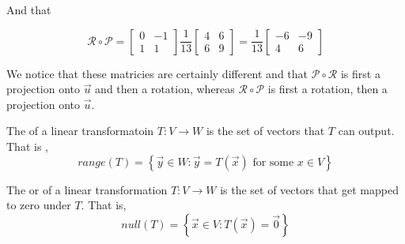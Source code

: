 \documentclass[notoc,notitlepage]{tufte-book}
\newcommand\mat[1]{\begin{bmatrix}#1\end{bmatrix}}
\begin{document}
And that 

\begin{equation*}
    \mathcal{R} \circ \mathcal{P} = \mat{ 0 & -1 \\ 1 & 1 } \frac{1}{13}
    \mat{ 4 & 6 \\ 6 & 9 } = \frac{1}{13} \mat{ -6 & -9 \\ 4 & 6 }
\end{equation*}

We notice that these matricies are certainly different and that $\mathcal{P}
\circ \mathcal{R}$ is first a projection onto $\vec{u}$ and then a rotation,
whereas $\mathcal{R} \circ \mathcal{P}$ is first a rotation, then a projection
onto $\vec{u}$.



\begin{defn}[Range]\label{defn:range}
    The  of a linear transformatoin $T : V \to W $ is the set of
    vectors that $T$ can output. That is ,
    \begin{equation*}
        \mathit{range} {\left( T \right)} = \left\{ \vec{y} \in W : \vec{y} =
        T\left(\vec{x} \right) \text{ for some } x \in V  \right\}
    \end{equation*}
\end{defn}

\begin{defn}\label{defn:null_space}
    The  or  of a linear transformation $T :
    V\to W $ is the set of vectors that get mapped to zero under $T$. That is,
    \begin{equation*}
        \mathit{null} {\left( T \right)} = \left\{ \vec{x} \in V:
        T\left(\vec{x}\right) = \vec{0} \right\}
    \end{equation*}
\end{defn}
\end{document}
